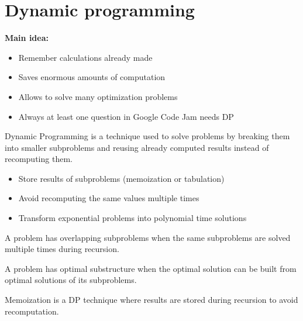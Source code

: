 \documentclass[11pt,a4paper,openany]{book}
\begin{document}
\vspace{2cm}




\chapter{Dynamic programming}


\begin{defnbox}[title=Dynamic Programming (DP)]
\textbf{Main idea:}
\begin{itemize}
    \item Remember calculations already made
    \item Saves enormous amounts of computation
    \item Allows to solve many optimization problems
    \item Always at least one question in Google Code Jam needs DP
\end{itemize}
\end{defnbox}

\begin{defnbox}[title=Dynamic Programming (DP)]
Dynamic Programming is a technique used to solve problems by breaking them into smaller subproblems and reusing already computed results instead of recomputing them.
\end{defnbox}

\begin{defnbox}[title=Main idea]
\begin{itemize}
    \item Store results of subproblems (memoization or tabulation)
    \item Avoid recomputing the same values multiple times
    \item Transform exponential problems into polynomial time solutions
\end{itemize}
\end{defnbox}

\begin{defnbox}[title=Overlapping subproblems]
A problem has overlapping subproblems when the same subproblems are solved multiple times during recursion.
\end{defnbox}

\begin{defnbox}[title=Optimal substructure]
A problem has optimal substructure when the optimal solution can be built from optimal solutions of its subproblems.
\end{defnbox}

\begin{defnbox}[title=Memoization (Top-down)]
Memoization is a DP technique where results are stored during recursion to avoid recomputation.
\end{defnbox}
\end{document}
